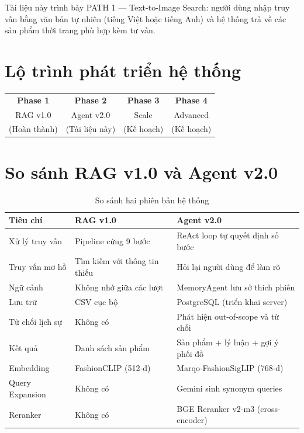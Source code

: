 \documentclass[12pt,a4paper]{report}
\begin{document}
Tài liệu này trình bày PATH 1 --- Text-to-Image Search: người dùng nhập truy vấn bằng văn bản tự nhiên (tiếng Việt hoặc tiếng Anh) và hệ thống trả về các sản phẩm thời trang phù hợp kèm tư vấn.

\section{Lộ trình phát triển hệ thống}

\begin{center}
\begin{tabular}{|c|c|c|c|}
\hline
\textbf{Phase 1} & \textbf{Phase 2} & \textbf{Phase 3} & \textbf{Phase 4}\\
RAG v1.0 & Agent v2.0 & Scale & Advanced\\
(Hoàn thành) & (Tài liệu này) & (Kế hoạch) & (Kế hoạch)\\
\hline
\end{tabular}
\end{center}

\section{So sánh RAG v1.0 và Agent v2.0}

\begin{table}[H]
\centering
\begin{tabular}{lll}
\toprule
\textbf{Tiêu chí} & \textbf{RAG v1.0} & \textbf{Agent v2.0}\\
\midrule
Xử lý truy vấn & Pipeline cứng 9 bước & ReAct loop tự quyết định số bước\\
Truy vấn mơ hồ & Tìm kiếm với thông tin thiếu & Hỏi lại người dùng để làm rõ\\
Ngữ cảnh & Không nhớ giữa các lượt & MemoryAgent lưu sở thích phiên\\
Lưu trữ & CSV cục bộ & PostgreSQL (triển khai server)\\
Từ chối lịch sự & Không có & Phát hiện out-of-scope và từ chối\\
Kết quả & Danh sách sản phẩm & Sản phẩm + lý luận + gợi ý phối đồ\\
Embedding & FashionCLIP (512-d) & Marqo-FashionSigLIP (768-d)\\
Query Expansion & Không có & Gemini sinh synonym queries\\
Reranker & Không có & BGE Reranker v2-m3 (cross-encoder)\\
\bottomrule
\end{tabular}
\caption{So sánh hai phiên bản hệ thống}
\end{table}
\end{document}
